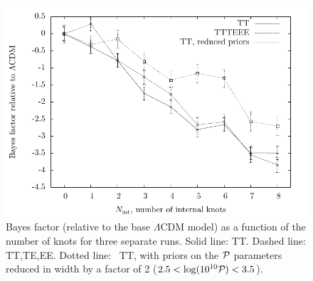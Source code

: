 \begin{figure}[tp]
  \includegraphics[width=\textwidth]{chapters/pps_reconstruction/figures/Bayes_PR}
  \caption{%
    Bayes factor (relative to the base \(\Lambda\)CDM model) as a function of the number of knots for three separate runs. Solid line: \Planck{} TT\@. Dashed line: \Planck{} TT,TE,EE\@. Dotted line: \Planck\ TT, with priors on the \(\mathcal{P}_{}\) parameters reduced in width by a factor of 2 (\(2.5<\log(10^{10}\mathcal{P}_{})<3.5\)).  }\label{fig:Bayes_Factors}
\end{figure}

